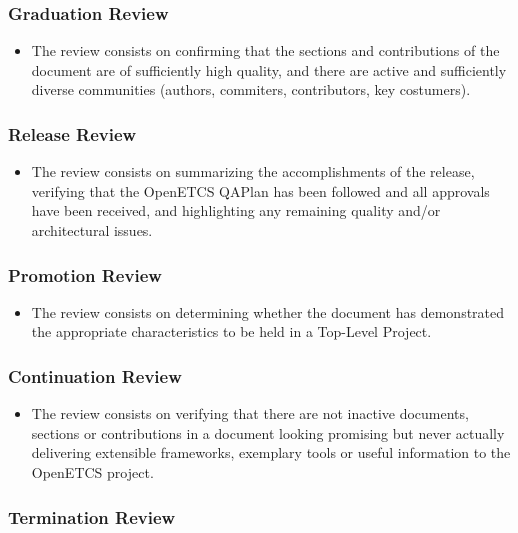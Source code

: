 \documentclass{template/openetcs_article}
\begin{document}
\subsubsection{Graduation Review}

\begin{itemize}
\item The review consists on confirming that the sections and contributions of the document are of sufficiently high quality, and there are active and sufficiently diverse communities (authors, commiters, contributors, key costumers). 
\end{itemize}

\subsubsection{Release Review}

\begin{itemize}
\item The review consists on summarizing the accomplishments of the release, verifying that the OpenETCS QAPlan has been followed and all approvals have been received, and highlighting any remaining quality and/or architectural issues.
\end{itemize}

\subsubsection{Promotion Review}

\begin{itemize}
\item The review consists on determining whether the document has demonstrated the appropriate characteristics to be held in a Top-Level Project. 
\end{itemize}

\subsubsection{Continuation Review}

\begin{itemize}
\item The review consists on verifying that there are not inactive documents, sections or contributions in a document looking promising but never actually delivering extensible frameworks, exemplary tools or useful information to the OpenETCS project. 
\end{itemize}

\subsubsection{Termination Review}
\end{document}
